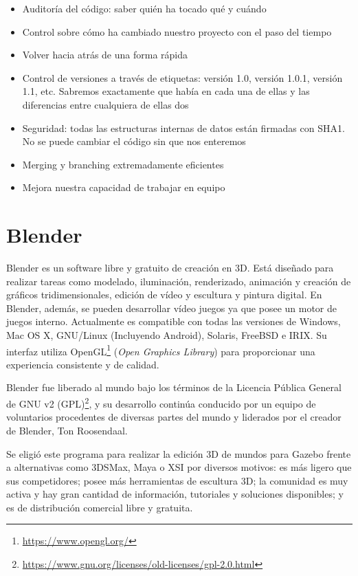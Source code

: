 \begin{itemize}
	\item Auditoría del código: saber quién ha tocado qué y cuándo
	\item Control sobre cómo ha cambiado nuestro proyecto con el paso del tiempo
	\item Volver hacia atrás de una forma rápida
	\item Control de versiones a través de etiquetas: versión 1.0, versión 1.0.1, versión 1.1, etc. Sabremos exactamente que había en cada una de ellas y las diferencias entre cualquiera de ellas dos
	\item Seguridad: todas las estructuras internas de datos están firmadas con SHA1. No se puede cambiar el código sin que nos enteremos
	\item Merging y branching extremadamente eficientes
	\item Mejora nuestra capacidad de trabajar en equipo
\end{itemize}



\section{Blender}
\label{sec:plat_blender}

Blender\cite{blender} es un software libre y gratuito de creación en 3D. Está diseñado para realizar tareas como modelado, iluminación, renderizado, animación y creación de gráficos tridimensionales, edición de vídeo y escultura y pintura digital. En Blender, además, se pueden desarrollar vídeo juegos ya que posee un motor de juegos interno. Actualmente es compatible con todas las versiones de Windows, Mac OS X, GNU/Linux (Incluyendo Android), Solaris, FreeBSD e IRIX. Su interfaz utiliza OpenGL\footnote{\url{https://www.opengl.org/}} (\textit{Open Graphics Library}) para proporcionar una experiencia consistente y de calidad.

Blender fue liberado al mundo bajo los términos de la Licencia Pública General de GNU v2 (GPL)\footnote{\url{https://www.gnu.org/licenses/old-licenses/gpl-2.0.html}}, y su desarrollo continúa conducido por un equipo de voluntarios procedentes de diversas partes del mundo y liderados por el creador de Blender, Ton Roosendaal. 

Se eligió este programa para realizar la edición 3D de mundos para Gazebo frente a alternativas como 3DSMax, Maya o XSI por diversos motivos: es más ligero que sus competidores; posee más herramientas de escultura 3D; la comunidad es muy activa y hay gran cantidad de información, tutoriales y soluciones disponibles; y es de distribución comercial libre y gratuita. 


